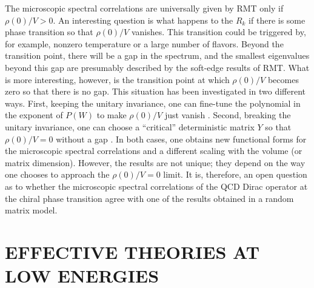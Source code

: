 The microscopic spectral correlations are universally given by RMT
only if $\rho(0)/V>0$.  An interesting question 
\cite{Akem98} is what happens to the $R_k$ if there is some phase
transition so that $\rho(0)/V$ vanishes.  This transition could be
triggered by, for example, nonzero temperature or a large number of flavors.
Beyond the transition point, there will be a gap in the spectrum, and
the smallest eigenvalues beyond this gap are presumably described by
the soft-edge results of RMT.  What is more interesting, however, is
the transition point at which $\rho(0)/V$  becomes zero so that
there is no gap.  This situation has been investigated in two
different ways.  First, keeping the unitary invariance, one can
fine-tune the polynomial in the exponent of $P(W)$ to make $\rho(0)/V$
just vanish \cite{Akem98}.  Second, breaking the unitary invariance,
one can choose a ``critical'' deterministic matrix $Y$ so that
$\rho(0)/V=0$ without a gap \cite{Hikami-Brezin,Jani98a}.  In both
cases, one obtains new functional forms for the microscopic spectral
correlations and a different scaling with the volume (or matrix
dimension).  However, the results are not unique; they depend on the
way one chooses to approach the $\rho(0)/V=0$ limit.  It is,
therefore, an open question as to whether the microscopic spectral
correlations of the QCD Dirac operator at the chiral phase transition
agree with one of the results obtained in a random matrix model.



\section{EFFECTIVE THEORIES AT LOW ENERGIES}
\label{sec:effective}

